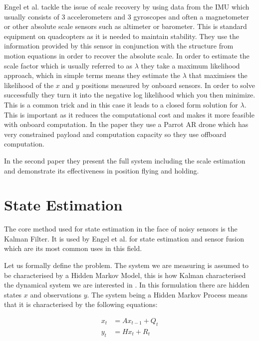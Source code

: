 \documentclass[]{../resources/final_report}
\begin{document}
Engel et al. tackle the issue of scale recovery by using data from the IMU which usually consists of 
3 accelerometers and 3 gyroscopes and often a magnetometer or other absolute scale sensors such as 
altimeter or barometer. This is standard equipment on quadcopters as it is needed to maintain stability. 
They use the information provided by this sensor in conjunction with the structure from motion 
equations in order to recover the absolute scale. In order to estimate the scale factor which is 
usually referred to as $\lambda$ they take a maximum likelihood approach, which in simple terms 
means they estimate the $\lambda$ that maximises the likelihood of the $x$ and $y$ positions 
measured by onboard sensors. In order to solve successfully they turn it into the negative log 
likelihood which you then minimize. This is a common trick and in this case it leads to a closed 
form solution for $\lambda$. This is important as it reduces the computational cost and makes it 
more feasible with onboard computation. In the paper they use a Parrot AR drone which has very 
constrained payload and computation capacity so they use offboard computation.

In the second paper \cite{Engel:FigureFlying} they present the full system including the scale 
estimation and demonstrate its effectiveness in position flying and holding.


\section{State Estimation}

The core method used for state estimation in the face of noisy sensors is the Kalman Filter. It is 
used by Engel et al.\cite{Engel:Camera-basedNav} for state estimation and sensor fusion which are 
its most common uses in this field.

Let us formally define the problem. The system we are measuring is assumed to be characterised by a 
Hidden Markov Model, this is how Kalman characterised the dynamical system we are interested in \cite{Kalman1960ANA}. 
In this formulation there are hidden states $x$ and observations $y$. The system being a Hidden 
Markov Process means that it is characterised by the following equations:

\begin{align}
  x_t &= Ax_{t-1} + Q_t \\
  y_t &= Hx_t + R_t
\end{align}
\end{document}
